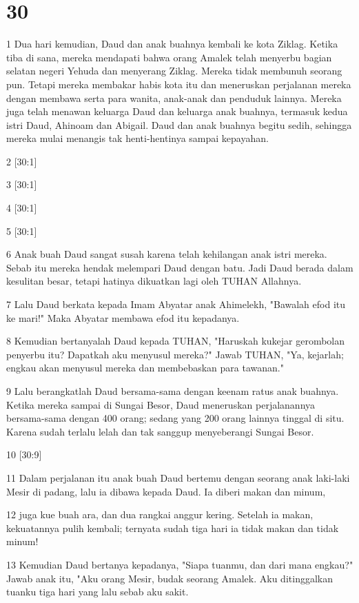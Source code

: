 \chapter{30}

\par 1 Dua hari kemudian, Daud dan anak buahnya kembali ke kota Ziklag. Ketika tiba di sana, mereka mendapati bahwa orang Amalek telah menyerbu bagian selatan negeri Yehuda dan menyerang Ziklag. Mereka tidak membunuh seorang pun. Tetapi mereka membakar habis kota itu dan meneruskan perjalanan mereka dengan membawa serta para wanita, anak-anak dan penduduk lainnya. Mereka juga telah menawan keluarga Daud dan keluarga anak buahnya, termasuk kedua istri Daud, Ahinoam dan Abigail. Daud dan anak buahnya begitu sedih, sehingga mereka mulai menangis tak henti-hentinya sampai kepayahan.
\par 2 [30:1]
\par 3 [30:1]
\par 4 [30:1]
\par 5 [30:1]
\par 6 Anak buah Daud sangat susah karena telah kehilangan anak istri mereka. Sebab itu mereka hendak melempari Daud dengan batu. Jadi Daud berada dalam kesulitan besar, tetapi hatinya dikuatkan lagi oleh TUHAN Allahnya.
\par 7 Lalu Daud berkata kepada Imam Abyatar anak Ahimelekh, "Bawalah efod itu ke mari!" Maka Abyatar membawa efod itu kepadanya.
\par 8 Kemudian bertanyalah Daud kepada TUHAN, "Haruskah kukejar gerombolan penyerbu itu? Dapatkah aku menyusul mereka?" Jawab TUHAN, "Ya, kejarlah; engkau akan menyusul mereka dan membebaskan para tawanan."
\par 9 Lalu berangkatlah Daud bersama-sama dengan keenam ratus anak buahnya. Ketika mereka sampai di Sungai Besor, Daud meneruskan perjalanannya bersama-sama dengan 400 orang; sedang yang 200 orang lainnya tinggal di situ. Karena sudah terlalu lelah dan tak sanggup menyeberangi Sungai Besor.
\par 10 [30:9]
\par 11 Dalam perjalanan itu anak buah Daud bertemu dengan seorang anak laki-laki Mesir di padang, lalu ia dibawa kepada Daud. Ia diberi makan dan minum,
\par 12 juga kue buah ara, dan dua rangkai anggur kering. Setelah ia makan, kekuatannya pulih kembali; ternyata sudah tiga hari ia tidak makan dan tidak minum!
\par 13 Kemudian Daud bertanya kepadanya, "Siapa tuanmu, dan dari mana engkau?" Jawab anak itu, "Aku orang Mesir, budak seorang Amalek. Aku ditinggalkan tuanku tiga hari yang lalu sebab aku sakit.
